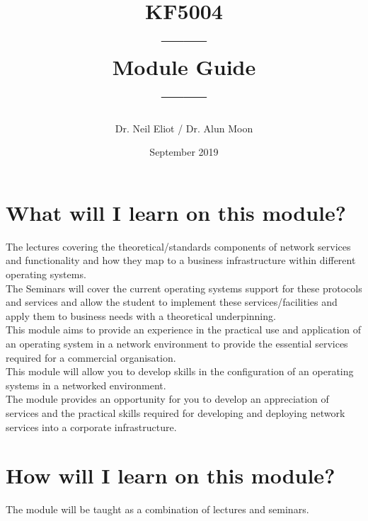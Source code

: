 \documentclass[11pt]{article}
\begin{document}
\author{Dr. Neil Eliot / Dr. Alun Moon}
\title{KF5004\\------\\Module Guide\\------\\}
\date{September 2019}
\maketitle


\newpage
\tableofcontents
\newpage

\section{What will I learn on this module?}

\noindent The lectures covering the theoretical/standards components of network services and functionality and how they map to a business infrastructure within different operating systems.\\

\noindent The Seminars will cover the current operating systems support for these protocols and services and allow the student to implement these services/facilities and apply them to business needs with a theoretical underpinning.\\

\noindent This module aims to provide an experience in the practical use and application of an operating system in a network environment to provide the essential services required for a commercial organisation.\\

\noindent This module will allow you to develop skills in the configuration of an operating systems in a networked environment.\\

\noindent The module provides an opportunity for you to develop an appreciation of services and the practical skills required for developing and deploying network services into a corporate infrastructure.\\



\section{How will I learn on this module?}

\noindent The module will be taught as a combination of lectures and seminars.\\
\end{document}
